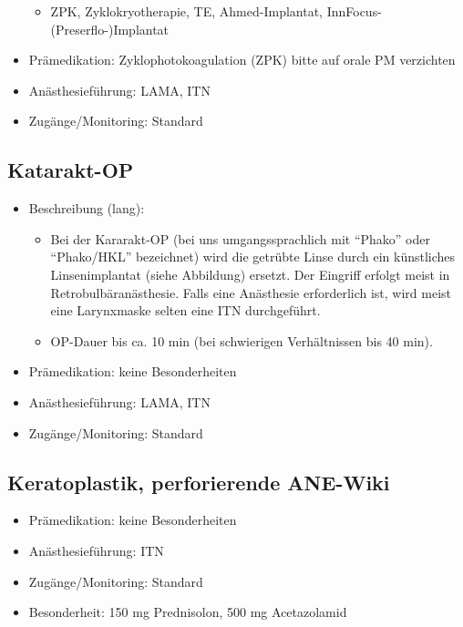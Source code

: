 \documentclass[
]{book}
\providecommand{\tightlist}{%
  \setlength{\itemsep}{0pt}\setlength{\parskip}{0pt}}
\begin{document}
\begin{itemize}
  \begin{itemize}
  \tightlist
  \item
    ZPK, Zyklokryotherapie, TE, Ahmed-Implantat, InnFocus-(Preserflo-)Implantat
  \end{itemize}
\item
  Prämedikation: Zyklophotokoagulation (ZPK) bitte auf orale PM verzichten
\item
  Anästhesieführung: LAMA, ITN
\item
  Zugänge/Monitoring: Standard
\end{itemize}

\hypertarget{katarakt-op}{%
\subsection{Katarakt-OP}\label{katarakt-op}}

\begin{itemize}
\tightlist
\item
  Beschreibung (lang):

  \begin{itemize}
  \tightlist
  \item
    Bei der Kararakt-OP (bei uns umgangssprachlich mit ``Phako'' oder ``Phako/HKL'' bezeichnet) wird die getrübte Linse durch ein künstliches Linsenimplantat (siehe Abbildung) ersetzt. Der Eingriff erfolgt meist in Retrobulbäranästhesie. Falls eine Anästhesie erforderlich ist, wird meist eine Larynxmaske selten eine ITN durchgeführt.
  \item
    OP-Dauer bis ca. 10 min (bei schwierigen Verhältnissen bis 40 min).
  \end{itemize}
\item
  Prämedikation: keine Besonderheiten
\item
  Anästhesieführung: LAMA, ITN
\item
  Zugänge/Monitoring: Standard
\end{itemize}

\hypertarget{keratoplastik-perforierende-ane-wiki}{%
\subsection{Keratoplastik, perforierende ANE-Wiki}\label{keratoplastik-perforierende-ane-wiki}}

\begin{itemize}
\tightlist
\item
  Prämedikation: keine Besonderheiten
\item
  Anästhesieführung: ITN
\item
  Zugänge/Monitoring: Standard
\item
  Besonderheit: 150 mg Prednisolon, 500 mg Acetazolamid
\end{itemize}
\end{document}
